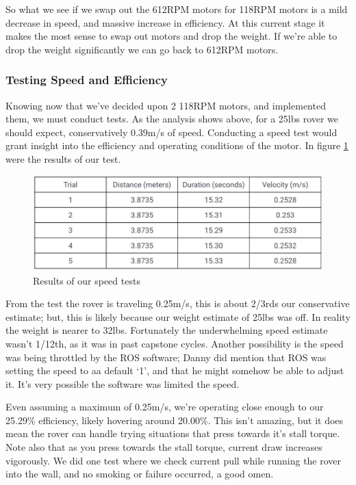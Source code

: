 \documentclass[a4paper, 10pt]{article}
\begin{document}
		So what we see if we swap out the 612RPM motors for 118RPM motors is a mild decrease in speed, and massive increase in efficiency. At this current stage it makes the most sense to swap out motors and drop the weight. If we're able to drop the weight significantly we can go back to 612RPM motors. 
		
		\subsubsection*{Testing Speed and Efficiency}
		Knowing now that we've decided upon 2 118RPM motors, and implemented them, we must conduct tests. As the analysis shows above, for a 25lbs rover we should expect, conservatively 0.39m/s of speed. Conducting a speed test would grant insight into the efficiency and operating conditions of the motor. In figure \ref{speed_test} were the results of our test.
		
		\begin{figure} [!h]
			\centering
			\includegraphics[scale=0.5]{Photos/speed_test}
			\caption{Results of our speed tests}
			\label{speed_test}
		\end{figure}
		
		From the test the rover is traveling 0.25m/s, this is about 2/3rds our conservative estimate; but, this is likely because our weight estimate of 25lbs was off. In reality the weight is nearer to 32lbs. Fortunately the underwhelming speed estimate wasn't 1/12th, as it was in past capstone cycles. Another possibility is the speed was being throttled by the ROS software; Danny did mention that ROS was setting the speed to aa default `1', and that he might somehow be able to adjust it. It's very possible the software was limited the speed.
		
		Even assuming a maximum of 0.25m/s, we're operating close enough to our 25.29\% efficiency, likely hovering around 20.00\%. This isn't amazing, but it does mean the rover can handle trying situations that press towards it's stall torque. Note also that as you press towards the stall torque, current draw increases vigorously. We did one test where we check current pull while running the rover into the wall, and no smoking or failure occurred, a good omen.
	
\end{document}

